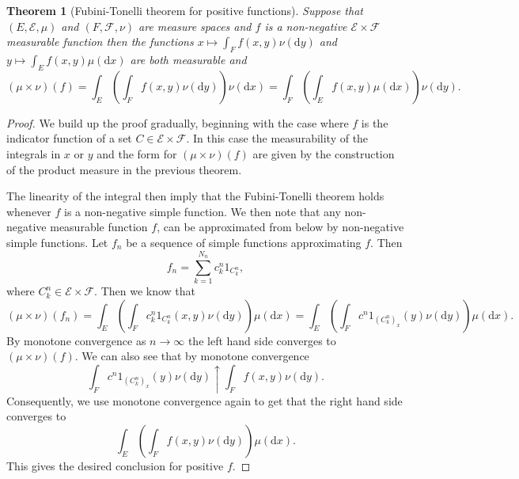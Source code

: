 \documentclass[11pt]{article}
\newtheorem{thm}{Theorem}[section]
\theoremstyle{definition}
\theoremstyle{remark}
\begin{document}
\begin{thm}[Fubini-Tonelli theorem for positive functions]
Suppose that $(E, \mathcal{E}, \mu)$ and $(F, \mathcal{F}, \nu)$ are measure spaces and $f$ is a non-negative $\mathcal{E} \times \mathcal{F}$ measurable function then the functions $x \mapsto \int_F f(x,y) \nu(\mathrm{d}y)$ and $y \mapsto \int_E f(x,y) \mu(\mathrm{d}x)$ are both measurable and
\[(\mu \times \nu)(f) = \int_E \left( \int_F f(x,y) \nu(\mathrm{d}y) \right) \nu(\mathrm{d}x) = \int_F \left( \int_E f(x,y) \mu(\mathrm{d}x) \right) \nu(\mathrm{d}y). \]
\end{thm}
\begin{proof}
We build up the proof gradually, beginning with the case where $f$ is the indicator function of a set $C \in \mathcal{E} \times \mathcal{F}$. In this case the measurability of the integrals in $x$ or $y$ and the form for $(\mu \times \nu)(f)$ are given by the construction of the product measure in the previous theorem. 

The linearity of the integral then imply that the Fubini-Tonelli theorem holds whenever $f$ is a non-negative simple function. We then note that any non-negative measurable function $f$, can be approximated from below by non-negative simple functions. Let $f_n$ be a sequence of simple functions approximating $f$. Then 
\[f_n = \sum_{k=1}^{N_n} c^n_k 1_{C^n_k}, \] where $C^n_k \in \mathcal{E} \times \mathcal{F}$. Then we know that
\[ (\mu \times \nu)(f_n) = \int_E \left( \int_F c^n_k 1_{C^n_k}(x,y) \nu(\mathrm{d}y) \right) \mu(\mathrm{d}x) = \int_E \left( \int_F c^n 1_{(C^n_k)_x}(y) \nu(\mathrm{d}y) \right)\mu(\mathrm{d}x). \] By monotone convergence as $n \rightarrow \infty$ the left hand side converges to $(\mu \times \nu)(f)$. We can also see that by monotone convergence
\[ \int_F c^n 1_{(C^n_k)_x}(y) \nu(\mathrm{d}y) \uparrow \int_F f(x,y) \nu(\mathrm{d}y). \] Consequently, we use monotone convergence again to get that the right hand side converges to
\[ \int_E \left( \int_F f(x,y) \nu(\mathrm{d}y) \right) \mu(\mathrm{d}x). \] This gives the desired conclusion for positive $f$. 
\end{proof}
\end{document}
